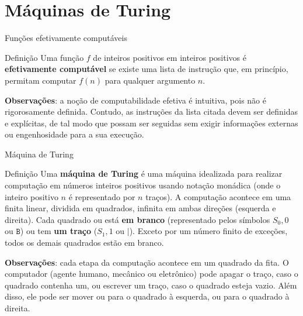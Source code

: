 \section{Máquinas de Turing}

\begin{frame}[fragile]{Funções efetivamente computáveis}

    \begin{block}{Definição}
        Uma função $f$ de inteiros positivos em inteiros positivos é \textbf{efetivamente 
        computável} se existe uma lista de instrução que, em princípio, permitam computar $f(n)$
        para qualquer argumento $n$.
    \end{block}

    \vspace{0.1in}

    \textbf{Observações}: a noção de computabilidade efetiva é intuitiva, pois não é rigorosamente
    definida. Contudo, as instruções da lista citada devem ser definidas e explícitas, de tal modo
    que possam ser seguidas sem exigir informações externas ou engenhosidade para a sua execução.
\end{frame}


\begin{frame}[fragile]{Máquina de Turing}

    \begin{block}{Definição}
        Uma \textbf{máquina de Turing} é uma máquina idealizada para realizar computação em 
        números inteiros positivos usando notação monádica (onde o inteiro positivo $n$ é 
        representado por $n$ traços). A computação acontece em uma finita linear, dividida em
        quadrados, infinita em ambas direções (esquerda e direita). Cada quadrado ou está 
        \textbf{em branco} (representado pelos símbolos $S_0, 0$ ou $\mathtt{B}$) ou tem 
        \textbf{um traço} ($S_1, 1$ ou $\mathtt{|}$).
        Exceto por um número finito de exceções, todos os demais quadrados estão em branco.
    \end{block}

    \vspace{0.1in}

    \textbf{Observações}: cada etapa da computação acontece em um quadrado da fita. O computador
    (agente humano, mecânico ou eletrônico) pode apagar o traço, caso o quadrado contenha um, ou 
    escrever um traço, caso o quadrado
    esteja vazio. Além disso, ele pode ser mover ou para o quadrado à esquerda, ou para o quadrado
    à direita.
\end{frame}

